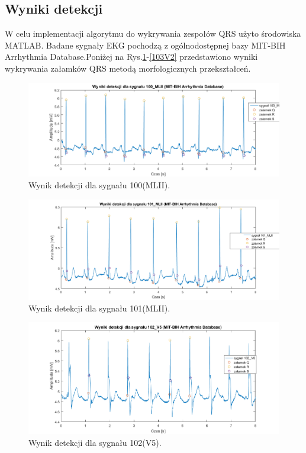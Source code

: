 \documentclass[10pt,a4paper]{article}
\begin{document}
\subsection{Wyniki detekcji}

W celu implementacji algorytmu do wykrywania zespołów QRS użyto środowiska MATLAB. Badane sygnały EKG pochodzą z ogólnodostępnej bazy MIT-BIH Arrhythmia Database.Poniżej na Rys.\ref{100MLII}-\ref{103V2} przedstawiono wyniki wykrywania załamków QRS metodą morfologicznych przekształceń.

\begin{figure}[h]
	\centerline{\includegraphics[scale=0.65]{100_MLII}}
	\caption{Wynik detekcji dla sygnału 100(MLII). }
	\label{100MLII}
\end{figure}

\begin{figure}[h]
	\centerline{\includegraphics[scale=0.65]{101_MLII}}
	\caption{Wynik detekcji dla sygnału 101(MLII).}
	\label{101MLII}
\end{figure}

\begin{figure}[h]
	\centerline{\includegraphics[scale=0.85]{102_V5}}
	\caption{Wynik detekcji dla sygnału 102(V5).}
	\label{102V5}
\end{figure}
\end{document}
